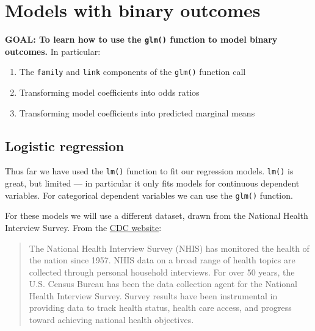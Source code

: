 \documentclass[
]{book}
\providecommand{\tightlist}{%
  \setlength{\itemsep}{0pt}\setlength{\parskip}{0pt}}
\begin{document}
\hypertarget{models-with-binary-outcomes}{%
\section{Models with binary outcomes}\label{models-with-binary-outcomes}}

\begin{alert}

\textbf{GOAL: To learn how to use the \texttt{glm()} function to model binary outcomes.} In particular:

\begin{enumerate}
\def\labelenumi{\arabic{enumi}.}
\tightlist
\item
  The \texttt{family} and \texttt{link} components of the \texttt{glm()} function call
\item
  Transforming model coefficients into odds ratios
\item
  Transforming model coefficients into predicted marginal means
\end{enumerate}

\end{alert}

\hypertarget{logistic-regression}{%
\subsection{Logistic regression}\label{logistic-regression}}

Thus far we have used the \texttt{lm()} function to fit our regression models. \texttt{lm()} is great, but limited --- in particular it only fits models for continuous dependent variables. For categorical dependent variables we can use the \texttt{glm()} function.

For these models we will use a different dataset, drawn from the National Health Interview Survey. From the \href{http://www.cdc.gov/nchs/nhis.htm}{CDC website}:

\begin{quote}
The National Health Interview Survey (NHIS) has monitored the health of the nation since 1957. NHIS data on a broad range of health topics are collected through personal household interviews. For over 50 years, the U.S. Census Bureau has been the data collection agent for the National Health Interview Survey. Survey results have been instrumental in providing data to track health status, health care access, and progress toward achieving national health objectives.
\end{quote}
\end{document}
